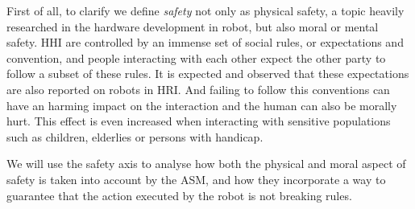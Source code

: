 First of all, to clarify we define \emph{safety} not only as physical safety, a topic heavily researched in the hardware development in robot, but also moral or mental safety. HHI are controlled by an immense set of social rules, or expectations and convention, and people interacting with each other expect the other party to follow a subset of these rules. It is expected and observed  that these expectations are also reported on robots in HRI. And failing to follow this conventions can have an harming impact on the interaction and the human can also be morally hurt. This effect is even increased when interacting with sensitive populations such as children, elderlies or persons with handicap.

We will use the safety axis to analyse how both the physical and moral aspect of safety is taken into account by the ASM, and how they incorporate a way to guarantee that the action executed by the robot is not breaking rules.
	

	
	
	
